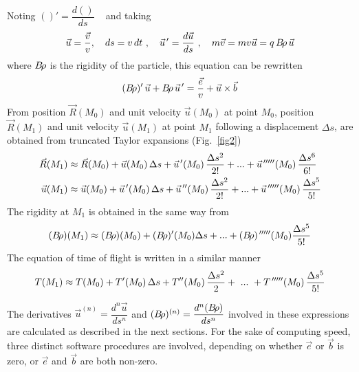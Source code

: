 \noindent Noting $()' = \dfrac{d()}{ds} $ ~  and taking      
%
\begin{equation}
\vec  u = \dfrac{\vec  v }{v},\quad
    	ds = v\,dt \ ,\quad
		\vec  u^{\,\prime}  =\dfrac{d\vec  u }{ds} \ ,\quad
			 m\vec  v = mv\vec  u = q\, B\!\rho \, \vec  u \label{eq2-2-2}
\end{equation}
 where $ B\!\rho $ is the rigidity of the particle, this equation can be rewritten 
%
\begin{equation}
(B\!\rho )^\prime \, \vec  u +B\!\rho \,\vec  u^{\,\prime}  
	=  \dfrac{\vec  e }{v}  + \vec  u  \times   \vec  b   \label{eq2-2-3}
\end{equation}
%
\noindent From position $ \vec  R(M_0) $ and unit velocity $ \vec  u(M_0) $ at
point $ M_0 $, position $ \vec  R(M_1) $ and unit velocity $ \vec  u(M_1) $ 
at point $ M_1 $ following a 
displacement  $ \Delta s $, are obtained from truncated Taylor expansions (Fig.~\ref{fig2})  
%
\begin{equation}
\begin{aligned}
\vec  R(M_1)  &  \approx  \vec  R(M_0) + \vec  u(M_0)\, \Delta s+ \vec  u^{\,\prime} (M_0)\,
	\dfrac{\Delta s^2 }{2!}  +  ...+ \vec  u^{\,\prime\prime\prime\prime\prime} (M_0)\,
	\dfrac{\Delta s^6 }{6!} \\
\vec  u(M_1) & \approx  \vec u(M_0)  + \vec  u^{\,\prime} (M_0)\,\Delta s  + \vec  u^{\,\prime\prime} (M_0)\,
	\dfrac{\Delta s^2 }{2!}  +   ...+ \vec  u^{\,\prime\prime\prime\prime\prime} (M_0)\,
	\dfrac{\Delta s^5 }{5!} 
\end{aligned}\label{eq2-2-4}
\end{equation}
%
\noindent The rigidity at $ M_1 $ is obtained in the same way from
\begin{equation}
 (B\!\rho )(M_1) \approx (B\!\rho )(M_0)+(B\!\rho )^\prime (M_0)\Delta s+...+
	(B\!\rho)^{\,\prime\prime\prime\prime\prime} (M_0) \dfrac{\Delta s^5 }{5!}   	\label{eq2-2-5}
\end{equation}
%
\noindent The equation of time of flight is written in a similar manner 
\begin{equation}
 T(M_1) \approx   T(M_0) +  T' (M_0)\, \Delta s+ T'' (M_0)\,\dfrac{\Delta s^2}{2} + 
    ~ ... ~  + T^{\,\prime\prime\prime\prime\prime} (M_0)\,\dfrac{\Delta s^5}{5!} 	\label{eq2-2-Time}
\end{equation}


\noindent The derivatives $\vec  u^{(n)} = \dfrac{d^n\vec  u}{ds^n}$ and 
$ (B\!\rho )^{(n)} = \dfrac{d^n(B\!\rho )}{ds^n} $
involved in these expressions are calculated as described in the next sections. 
For the sake of computing speed, three distinct software procedures are involved, depending on 
whether $\vec e$ or $\vec  b$ is zero, or $ \vec e$ and $ \vec b$ are 
both non-zero.

